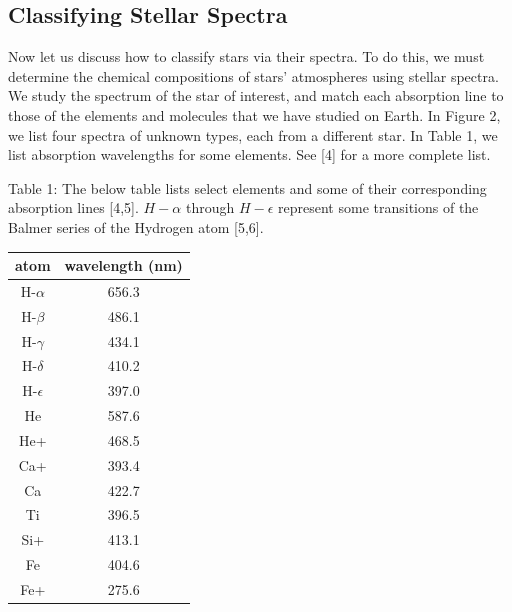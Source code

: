 \documentclass[12pt]{article}
\begin{document}
\subsection{Classifying Stellar Spectra}

Now let us discuss how to classify stars via their spectra. To do this, we must
determine the chemical compositions of stars’ atmospheres using stellar spectra. We study the spectrum of the star of interest, and match each absorption line to those of the elements and molecules that we have studied on Earth. In Figure 2, we list four spectra of unknown types, each from a different star. In Table 1, we list absorption wavelengths for some elements. See [4] for a more complete list.

Table 1: The below table lists select elements and some of their corresponding
absorption lines [4,5]. $H-\alpha$ through $H-\epsilon$ represent some transitions of the
Balmer series of the Hydrogen atom [5,6].

\begin{center}
\begin{tabular}{c | c}
atom & wavelength (nm) \\
\hline
\hline
H-$\alpha$ &  656.3 \\
H-$\beta$ & 486.1 \\
H-$\gamma$ & 434.1 \\
H-$\delta$ & 410.2 \\
H-$\epsilon$ & 397.0 \\
He & 587.6\\
He+  & 468.5\\
Ca+  & 393.4\\
Ca & 422.7\\
Ti & 396.5 \\
Si+  & 413.1\\
Fe & 404.6\\
Fe+ & 275.6\\
\hline
\end{tabular}
\end{center}
\end{document}
